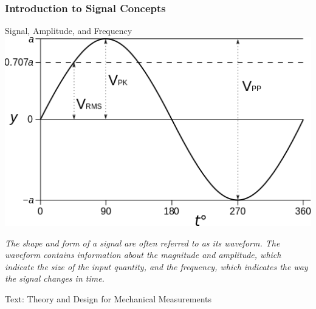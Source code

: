 \documentclass[fleqn]{beamer} %
\newcommand{\sectionIsubsectionItitle}{Introduction to Signal Concepts}
\newcommand{\btVFill}{\vskip0pt plus 1filll}
\begin{document}
			\begin{frame}
				\frametitle{\sectionIsubsectionItitle}
				
						\begin{multicols}{2}
		{\PR Signal}, {\RD Amplitude}, and {\BL Frequency}\vspace{2mm}\\
		\includegraphics[scale=.3]{images/amplitude_frequency.png} 
		
		{\it The shape and form of a {\PR signal} are often referred to as its {\PN waveform}.
		The {\PN waveform} contains information about the magnitude and {\RD amplitude}, which indicate the size of
		the input quantity, and the {\BL frequency}, which indicates the way the {\PR signal} changes in time. }\vspace{5mm}\\
		\end{multicols}
		\tiny{Text: Theory and Design for Mechanical Measurements}	



			\end{frame}
\end{document}
